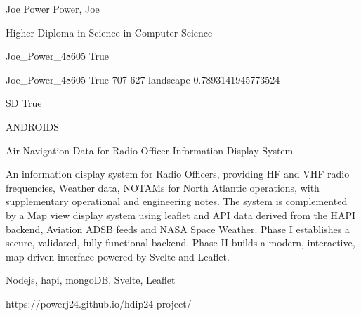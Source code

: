 \documentclass[twoside]{report}
\begin{document}
\begingroup{}\relax



\def\Key{Joe_Power_48605}

{Joe Power}
{Power, Joe}

{Higher Diploma in Science in Computer Science}

{Joe_Power_48605}
{True}

{Joe_Power_48605}
{True}
{707}
{627}
{landscape}
{0.7893141945773524}

{SD}
{True}

{ANDROIDS}

{Air Navigation Data for Radio Officer Information Display System}

{An information display system for Radio Officers, providing HF and VHF radio frequencies, Weather data, NOTAMs for North Atlantic operations, with supplementary operational and engineering notes. The system is complemented by a Map view display system using leaflet and API data derived from the HAPI backend, Aviation ADSB feeds and NASA Space Weather. Phase I establishes a secure, validated, fully functional backend. Phase II builds a modern, interactive, map‑driven interface powered by Svelte and Leaflet.}

{Nodejs, hapi, mongoDB, Svelte, Leaflet}

{https://powerj24.github.io/hdip24-project/}
\end{document}
